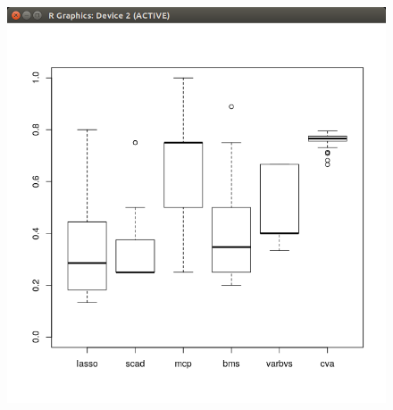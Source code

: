 \documentclass{amsart}[12pt]
\begin{document}
\begin{figure}
\includegraphics{Particle_EM_high_dimensional_cold_start.png}
\end{figure}



\end{document}
